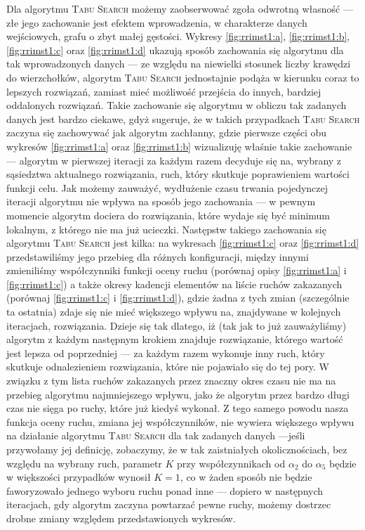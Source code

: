 Dla algorytmu \textsc{Tabu Search} możemy zaobserwować zgoła odwrotną własność --- złe jego zachowanie jest efektem wprowadzenia, w charakterze danych wejściowych, grafu o zbyt małej gęstości. Wykresy \ref{fig:rrimst1:a}, \ref{fig:rrimst1:b}, \ref{fig:rrimst1:c} oraz \ref{fig:rrimst1:d} ukazują sposób zachowania się algorytmu dla tak wprowadzonych danych --- ze względu na niewielki stosunek liczby krawędzi do wierzchołków, algorytm \textsc{Tabu Search} jednostajnie podąża w kierunku coraz to lepszych rozwiązań, zamiast mieć możliwość przejścia do innych, bardziej oddalonych rozwiązań. Takie zachowanie się algorytmu w obliczu tak zadanych danych jest bardzo ciekawe, gdyż sugeruje, że w takich przypadkach \textsc{Tabu Search} zaczyna się zachowywać jak algorytm zachłanny, gdzie pierwsze części obu wykresów \ref{fig:rrimst1:a} oraz \ref{fig:rrimst1:b} wizualizuję właśnie takie zachowanie --- algorytm w pierwszej iteracji za każdym razem decyduje się na, wybrany z sąsiedztwa aktualnego rozwiązania, ruch, który skutkuje poprawieniem wartości funkcji celu. Jak możemy zauważyć, wydłużenie czasu trwania pojedynczej iteracji algorytmu nie wpływa na sposób jego zachowania --- w pewnym momencie algorytm dociera do rozwiązania, które wydaje się być minimum lokalnym, z którego nie ma już ucieczki. Następstw takiego zachowania się algorytmu \textsc{Tabu Search} jest kilka: na wykresach \ref{fig:rrimst1:c} oraz \ref{fig:rrimst1:d} przedstawiliśmy jego przebieg dla różnych konfiguracji, między innymi zmieniliśmy współczynniki funkcji oceny ruchu (porównaj opisy \ref{fig:rrimst1:a} i \ref{fig:rrimst1:c}) a także okresy kadencji elementów na liście ruchów zakazanych (porównaj \ref{fig:rrimst1:c} i \ref{fig:rrimst1:d}), gdzie żadna z tych zmian (szczególnie ta ostatnia) zdaje się nie mieć większego wpływu na, znajdywane w kolejnych iteracjach, rozwiązania. Dzieje się tak dlatego, iż (tak jak to już zauważyliśmy) algorytm z każdym następnym krokiem znajduje rozwiązanie, którego wartość jest lepsza od poprzedniej --- za każdym razem wykonuje inny ruch, który skutkuje odnalezieniem rozwiązania, które nie pojawiało się do tej pory. W związku z tym lista ruchów zakazanych przez znaczny okres czasu nie ma na przebieg algorytmu najmniejszego wpływu, jako że algorytm przez bardzo długi czas nie sięga po ruchy, które już kiedyś wykonał. Z tego samego powodu nasza funkcja oceny ruchu, zmiana jej współczynników, nie wywiera większego wpływu na działanie algorytmu \textsc{Tabu Search} dla tak zadanych danych ---jeśli przywołamy jej definicję, zobaczymy, że w tak zaistniałych okolicznościach, bez względu na wybrany ruch, parametr $K$ przy współczynnikach od $\alpha_{2}$ do $\alpha_{5}$ będzie w większości przypadków wynosił $K = 1$, co w żaden sposób nie będzie faworyzowało jednego wyboru ruchu ponad inne --- dopiero w następnych iteracjach, gdy algorytm zaczyna powtarzać pewne ruchy, możemy dostrzec drobne zmiany względem przedstawionych wykresów.

